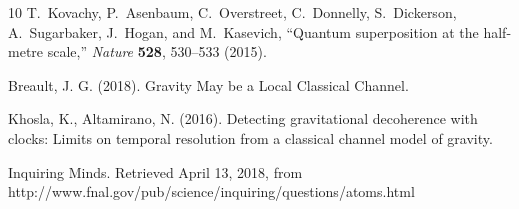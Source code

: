 \documentclass[aps, prd, superscriptaddress,twocolumn,amsmath,amssymb,nofootinbib]{revtex4-1}
\begin{document}
\begin{thebibliography}{10}
T.~Kovachy, P.~Asenbaum, C.~Overstreet, C.~Donnelly, S.~Dickerson,
  A.~Sugarbaker, J.~Hogan, and M.~Kasevich, ``Quantum superposition at the
  half-metre scale,'' {\em Nature} {\bfseries 528}, 530--533 (2015).

Breault, J. G. (2018). Gravity May be a Local Classical Channel.

Khosla, K., Altamirano, N. (2016). Detecting gravitational decoherence with clocks: Limits on temporal resolution from a classical channel model of gravity.

Inquiring Minds. Retrieved April 13, 2018, from http://www.fnal.gov/pub/science/inquiring/questions/atoms.html

\end{thebibliography}\endgroup
\end{document}
